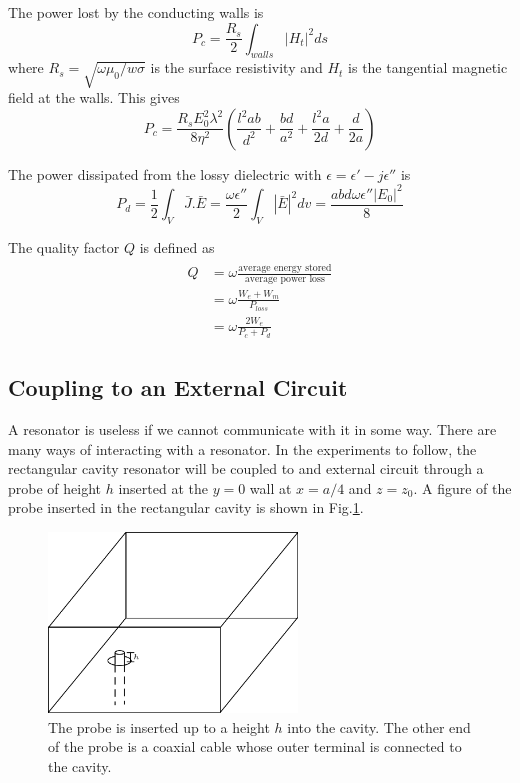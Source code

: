 The power lost by the conducting walls is
\begin{equation}
P_c=\frac{R_s}{2}\int_{walls} |H_t|^2ds
\end{equation}
where $R_s=\sqrt{\omega\mu_0/w\sigma}$ is the surface resistivity and $H_t$ is the tangential magnetic field at the walls. This gives
\begin{equation}
P_c=\frac{R_sE_0^2\lambda^2}{8\eta^2}\left(\frac{l^2ab}{d^2}+\frac{bd}{a^2}+\frac{l^2a}{2d}+\frac{d}{2a}\right)
\end{equation}

The power dissipated from the lossy dielectric with $\epsilon = \epsilon'-j\epsilon''$ is
\begin{equation}
P_d = \frac{1}{2}\int_V\bar{J}.\bar{E}=\frac{\omega\epsilon''}{2}\int_V|\bar{E}|^2dv=\frac{abd\omega\epsilon''|E_0|^2}{8}
\end{equation}

The quality factor $Q$ is defined as
\begin{align}
\begin{split}
Q&=\omega\frac{\text{average energy stored}}{\text{average power loss}}\\
&=\omega\frac{W_e+W_m}{P_{loss}}\\
&=\omega\frac{2W_e}{P_c+P_d}
\end{split}
\end{align}

\subsection{Coupling to an External Circuit}

A resonator is useless if we cannot communicate with it in some way. There are many ways of interacting with a resonator. In the experiments to follow, the rectangular cavity resonator will be coupled to and external circuit through a probe of height $h$ inserted at the $y=0$ wall at $x=a/4$ and $z=z_0$. A figure of the probe inserted in the rectangular cavity is shown in Fig.\ref{fig:Probe}.

\begin{figure}
\centering
\includegraphics[width=250px]{Figures/probe}
\decoRule
\caption[Probe in resonator]{The probe is inserted up to a height $h$ into the cavity. The other end of the probe is a coaxial cable whose outer terminal is connected to the cavity.}
\label{fig:Probe}
\end{figure}

